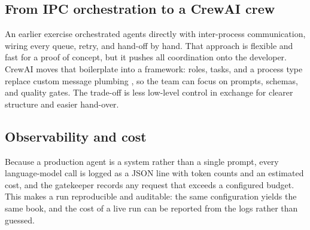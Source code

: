 \subsection{From IPC orchestration to a CrewAI crew}

An earlier exercise orchestrated agents directly with inter-process
communication, wiring every queue, retry, and hand-off by hand. That approach
is flexible and fast for a proof of concept, but it pushes all coordination
onto the developer. CrewAI moves that boilerplate into a framework: roles,
tasks, and a process type replace custom message plumbing \cite{crewai2026},
so the team can focus on prompts, schemas, and quality gates. The trade-off is
less low-level control in exchange for clearer structure and easier hand-over.

\subsection{Observability and cost}

Because a production agent is a system rather than a single prompt, every
language-model call is logged as a JSON line with token counts and an estimated
cost, and the gatekeeper records any request that exceeds a configured budget.
This makes a run reproducible and auditable: the same configuration yields the
same book, and the cost of a live run can be reported from the logs rather than
guessed.
